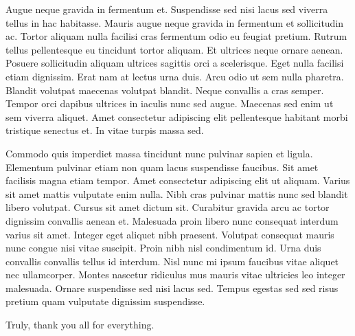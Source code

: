 \begin{DoubleSpace}
Augue neque gravida in fermentum et. Suspendisse sed nisi lacus sed viverra tellus in hac habitasse. Mauris augue neque gravida in fermentum et sollicitudin ac. Tortor aliquam nulla facilisi cras fermentum odio eu feugiat pretium. Rutrum tellus pellentesque eu tincidunt tortor aliquam. Et ultrices neque ornare aenean. Posuere sollicitudin aliquam ultrices sagittis orci a scelerisque. Eget nulla facilisi etiam dignissim. Erat nam at lectus urna duis. Arcu odio ut sem nulla pharetra. Blandit volutpat maecenas volutpat blandit. Neque convallis a cras semper. Tempor orci dapibus ultrices in iaculis nunc sed augue. Maecenas sed enim ut sem viverra aliquet. Amet consectetur adipiscing elit pellentesque habitant morbi tristique senectus et. In vitae turpis massa sed.

Commodo quis imperdiet massa tincidunt nunc pulvinar sapien et ligula. Elementum pulvinar etiam non quam lacus suspendisse faucibus. Sit amet facilisis magna etiam tempor. Amet consectetur adipiscing elit ut aliquam. Varius sit amet mattis vulputate enim nulla. Nibh cras pulvinar mattis nunc sed blandit libero volutpat. Cursus sit amet dictum sit. Curabitur gravida arcu ac tortor dignissim convallis aenean et. Malesuada proin libero nunc consequat interdum varius sit amet. Integer eget aliquet nibh praesent. Volutpat consequat mauris nunc congue nisi vitae suscipit. Proin nibh nisl condimentum id. Urna duis convallis convallis tellus id interdum. Nisl nunc mi ipsum faucibus vitae aliquet nec ullamcorper. Montes nascetur ridiculus mus mauris vitae ultricies leo integer malesuada. Ornare suspendisse sed nisi lacus sed. Tempus egestas sed sed risus pretium quam vulputate dignissim suspendisse.

Truly, thank you all for everything.
\end{DoubleSpace}
